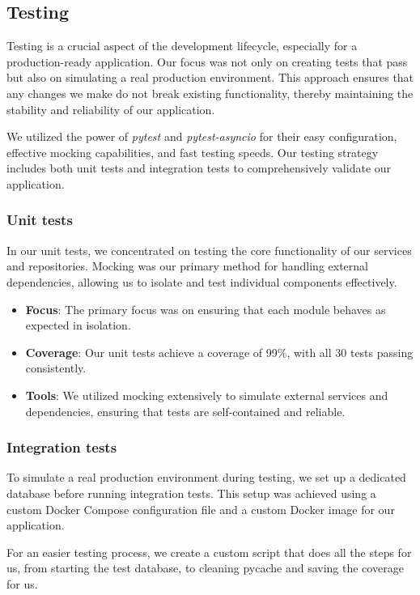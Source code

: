 \subsection{Testing}
Testing is a crucial aspect of the development lifecycle, especially for a production-ready application. Our focus was not only on creating tests that pass but also on simulating a real production environment. This approach ensures that any changes we make do not break existing functionality, thereby maintaining the stability and reliability of our application.

We utilized the power of \textit{pytest} \cite{pytest} and \textit{pytest-asyncio} \cite{pytest_asyncio} for their easy configuration, effective mocking capabilities, and fast testing speeds. Our testing strategy includes both unit tests and integration tests to comprehensively validate our application.

\subsubsection{Unit tests}
In our unit tests, we concentrated on testing the core functionality of our services and repositories. Mocking was our primary method for handling external dependencies, allowing us to isolate and test individual components effectively.

\begin{itemize}
    \item \textbf{Focus}: The primary focus was on ensuring that each module behaves as expected in isolation.
    \item \textbf{Coverage}: Our unit tests achieve a coverage of 99\%, with all 30 tests passing consistently.
    \item \textbf{Tools}: We utilized mocking extensively to simulate external services and dependencies, ensuring that tests are self-contained and reliable.
\end{itemize}

\subsubsection{Integration tests}
To simulate a real production environment during testing, we set up a dedicated database before running integration tests. This setup was achieved using a custom Docker Compose configuration file and a custom Docker image for our application.

For an easier testing process, we create a custom script that does all the steps for us, from starting the test database, to cleaning pycache and saving the coverage for us.

